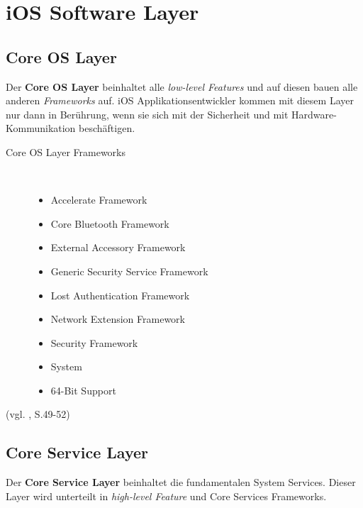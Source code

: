 \section{iOS Software Layer}
\label{sec:iOSSWLayer}

\subsection{Core OS Layer}
\label{sec:CoreLayer}

Der \textbf{Core OS Layer} beinhaltet alle \textit{\glqq low-level Features\grqq{}} und auf diesen bauen alle anderen \textit{\glqq Frameworks\grqq{}} auf. iOS Applikationsentwickler kommen mit diesem Layer nur dann in Berührung, wenn sie sich mit der Sicherheit und mit Hardware-Kommunikation beschäftigen. 
\begin{description}
	\item[Core OS Layer Frameworks]~\par
	\begin{itemize}
		\item Accelerate Framework
		\item Core Bluetooth Framework
		\item External Accessory Framework
		\item Generic Security Service Framework
		\item Lost Authentication Framework
		\item Network Extension Framework
		\item Security Framework
		\item System
		\item 64-Bit Support
	\end{itemize}
\end{description}
 (vgl. \cite{Apple[6]}, S.49-52)
\subsection{Core Service Layer}
\label{sec:CoreServiceLayer}		
Der \textbf{Core Service Layer} beinhaltet die fundamentalen System Services. Dieser Layer wird unterteilt in \textit{\glqq high-level Feature\grqq{}} und Core Services Frameworks.

